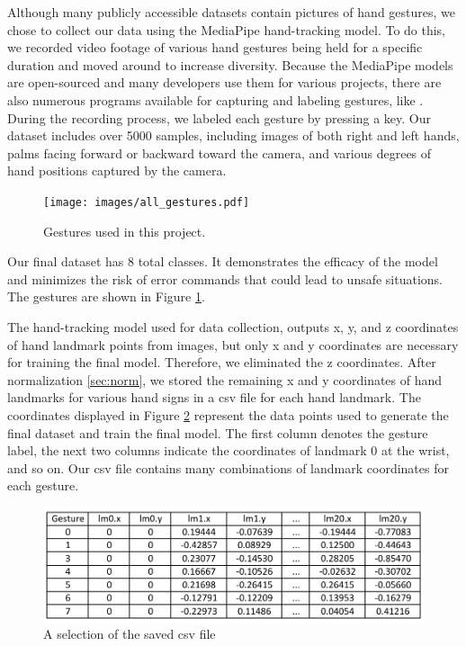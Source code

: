 Although many publicly accessible datasets contain pictures of hand gestures, we chose to collect our data using the MediaPipe hand-tracking model. To do this, we recorded video footage of various hand gestures being held for a specific duration and moved around to increase diversity. Because the MediaPipe models are open-sourced and many developers use them for various projects, there are also numerous programs available for capturing and labeling gestures, like \cite{opencv_mediapipe_hand_gesture_recognition}. During the recording process, we labeled each gesture by pressing a key. Our dataset includes over 5000 samples, including images of both right and left hands, palms facing forward or backward toward the camera, and various degrees of hand positions captured by the camera.

\begin{figure}
	\centering
	\texttt{[image: images/all\_gestures.pdf]}
	\caption{Gestures used in this project.}
	\label{fig:all_gestures}
\end{figure}


Our final dataset has 8 total classes. It demonstrates the efficacy of the model and minimizes the risk of error commands that could lead to unsafe situations. The gestures are shown in Figure \ref{fig:all_gestures}.


The hand-tracking model used for data collection, outputs x, y, and z coordinates of hand landmark points from images, but only x and y coordinates are necessary for training the final model. Therefore, we eliminated the z coordinates. After normalization \ref{sec:norm}, we stored the remaining x and y coordinates of hand landmarks for various hand signs in a csv file for each hand landmark. The coordinates displayed in Figure \ref{fig:saved_csv} represent the data points used to generate the final dataset and train the final model. The first column denotes the gesture label, the next two columns indicate the coordinates of landmark 0 at the wrist, and so on. Our csv file contains many combinations of landmark coordinates for each gesture.


\begin{figure}[h]
	\centering
	\includegraphics[width = \textwidth]{images/gesture_laandmarks-cropped.pdf}
	\caption{A selection of the saved csv file}
	\label{fig:saved_csv}
\end{figure}


